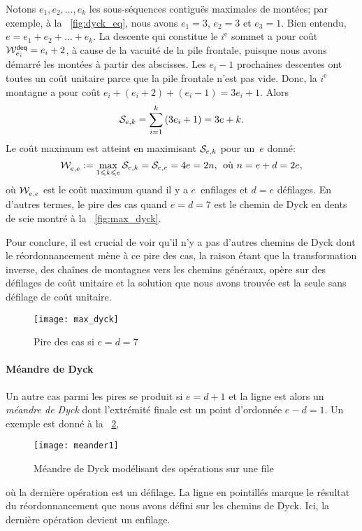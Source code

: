 Notons \(e_1, e_2, \dots, e_k\) les sous-séquences contiguës maximales
de montées; par exemple, à la \fig~\ref{fig:dyck_eq}, nous avons
\(e_1=3\), \(e_2 = 3\) et \(e_3 = 1\). Bien entendu, \(e = e_1 + e_2 +
\dots + e_k\). La descente qui constitue le \(i^\text{e}\) sommet a
pour coût  \(\W{\fun{deq}}{e_i} = e_i +
2\), à cause de la vacuité de la pile frontale, puisque nous avons
démarré les montées à partir des abscisses. Les \(e_i-1\) prochaines
descentes ont toutes un coût unitaire parce que la pile frontale n'est
pas vide. Donc, la \(i^\text{e}\) montagne a pour coût
\(e_i+(e_i+2)+(e_i-1) = 3e_i+1\). Alors
\begin{equation*}
  \A{e,k} = \sum_{i=1}^{k}{(3e_i+1)} = 3e + k.
\end{equation*}
Le coût maximum est atteint en maximisant \(\A{e,k}\) pour un~\(e\)
donné:
\begin{equation*}
\W{}{e,e} := \max_{1 \leqslant k \leqslant e}{\A{e,k}} = \A{e,e} = 4e
= 2n,\,\; \text{où \(n=e+d=2e\)},
\end{equation*}
où \(\W{}{e,e}\) est le coût maximum quand il y a \(e\)~enfilages et
\({d=e}\) défilages. En d'autres termes, le pire des cas quand
\(e=d=7\) est le chemin de Dyck en dents de scie montré à la
\fig~\vref{fig:max_dyck}.

Pour conclure, il est crucial de voir qu'il n'y a pas d'autres chemins
de Dyck dont le réordonnancement mène à ce pire des cas, la raison
étant que la transformation inverse, des chaînes de montagnes vers les
chemins généraux, opère sur des défilages de coût unitaire et la
solution que nous avons trouvée est la seule sans défilage de coût
unitaire.
\begin{figure}
\centering
\texttt{[image: max\_dyck]}
\caption{Pire des cas si \(e=d=7\)}
\label{fig:max_dyck}
\end{figure}

\paragraph{Méandre de Dyck}

Un autre cas parmi les pires se produit si \(e= d + 1\) et la ligne
est alors un \emph{méandre de Dyck} dont l'extrémité finale est un
point d'ordonnée \(e-d=1\). Un exemple est donné à la
\fig~\ref{fig:meander1},
\begin{figure}
\centering
\texttt{[image: meander1]}
\caption{Méandre de Dyck modélisant des opérations sur une file}
\label{fig:meander1}
\end{figure}
où la dernière opération est un défilage. La ligne en pointillés
marque le résultat du réordonnancement que nous avons défini sur les
chemins de Dyck. Ici, la dernière opération devient un enfilage.


